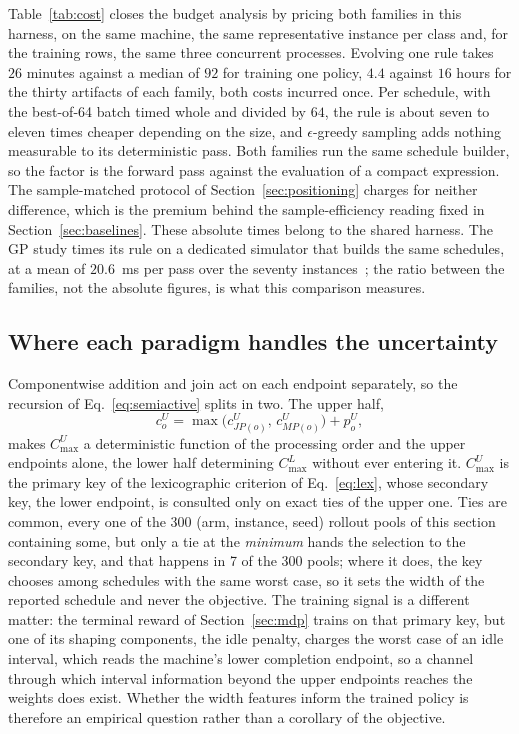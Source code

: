 \documentclass[preprint,authoryear,12pt]{elsarticle}
\theoremstyle{definition}
\theoremstyle{remark}
\begin{document}
Table~\ref{tab:cost} closes the budget analysis by pricing both
families in this harness, on the same machine, the same
representative instance per class and, for the training rows, the
same three concurrent processes. Evolving one rule takes $26$ minutes
against a median of $92$ for training one policy, $4.4$ against $16$
hours for the thirty artifacts of each family, both costs incurred
once. Per schedule, with the best-of-64 batch timed whole and
divided by $64$, the rule is about seven to eleven times cheaper
depending on the size, and $\epsilon$-greedy sampling adds nothing
measurable to its deterministic pass. Both families run the same
schedule builder, so the factor is the forward pass against the
evaluation of a compact expression. The sample-matched protocol of
Section~\ref{sec:positioning} charges for neither difference, which
is the premium behind the sample-efficiency reading fixed in
Section~\ref{sec:baselines}. These absolute times belong to the shared
harness. The GP study times its rule on a dedicated simulator that
builds the same schedules, at a mean of $20.6$~ms per pass over the
seventy instances~\citep{DiazGP2026}; the ratio between the families,
not the absolute figures, is what this comparison measures.

\subsection{Where each paradigm handles the uncertainty}
\label{sec:ablations-interval}

Componentwise addition and join act on each endpoint separately, so
the recursion of Eq.~\eqref{eq:semiactive} splits in two. The upper
half,
\begin{equation}
c^{U}_{o}=\max\!\big(c^{U}_{JP(o)},\,c^{U}_{MP(o)}\big)+p^{U}_{o},
\label{eq:upperclosed}
\end{equation}
makes $C^U_{\max}$ a deterministic function of the processing order
and the upper endpoints alone, the lower half determining
$C^L_{\max}$ without ever entering it. $C^U_{\max}$ is the primary
key of the lexicographic criterion of Eq.~\eqref{eq:lex}, whose
secondary key, the lower endpoint, is consulted only on exact ties of
the upper one. Ties are common, every one of the 300 (arm, instance,
seed) rollout pools of this section containing some, but only a tie
at the \emph{minimum} hands the selection to the secondary key, and
that happens in 7 of the 300 pools; where it does, the key chooses
among schedules with the same worst case, so it sets the width of the
reported schedule and never the objective. The training signal is a
different matter: the terminal reward of Section~\ref{sec:mdp} trains
on that primary key, but one of its shaping components, the idle
penalty, charges the worst case of an idle interval, which reads the
machine's lower completion endpoint, so a channel through which
interval information beyond the upper endpoints reaches the weights
does exist. Whether the width features inform the trained policy is
therefore an empirical question rather than a corollary of the
objective.
\end{document}
